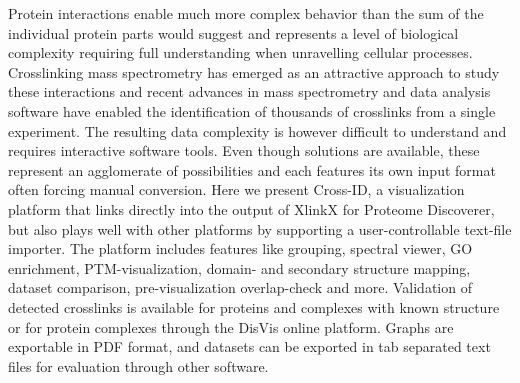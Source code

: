 \begin{abstract102}
  Protein interactions enable much more complex behavior than the sum of the individual protein parts would suggest and represents a level of biological complexity requiring full understanding when unravelling cellular processes. Crosslinking mass spectrometry has emerged as an attractive approach to study these interactions and recent advances in mass spectrometry and data analysis software have enabled the identification of thousands of crosslinks from a single experiment. The resulting data complexity is however difficult to understand and requires interactive software tools. Even though solutions are available, these represent an agglomerate of possibilities and each features its own input format often forcing manual conversion. Here we present Cross-ID, a visualization platform that links directly into the output of XlinkX for Proteome Discoverer, but also plays well with other platforms by supporting a user-controllable text-file importer. The platform includes features like grouping, spectral viewer, GO enrichment, PTM-visualization, domain- and secondary structure mapping, dataset comparison, pre-visualization overlap-check and more. Validation of detected crosslinks is available for proteins and complexes with known structure or for protein complexes through the DisVis online platform. Graphs are exportable in PDF format, and datasets can be exported in tab separated text files for evaluation through other software.
\end{abstract102}
\thumbforchapter

